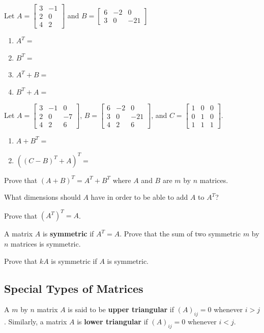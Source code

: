 \bq Let $A=\begin{bmatrix} 3&-1 \\2&0 \\ 4&2 \end{bmatrix}$ and $B=\begin{bmatrix} 6&-2&0 \\3&0&-21 \end{bmatrix}$
\begin{enumerate}
\item $A^T=$
\item $B^T=$
\item $A^T+B=$
\item $B^T+A=$
\end{enumerate}
\eq

\bq Let $A=\begin{bmatrix} 3&-1&0 \\2&0&-7 \\ 4&2&6 \end{bmatrix}$, $B=\begin{bmatrix} 6&-2&0 \\3&0&-21 \\ 4&2&6 \end{bmatrix}$, \break and $C=\begin{bmatrix} 1&0&0 \\0&1&0\\1&1&1 \end{bmatrix}$.
\begin{enumerate}
\item $A+B^T=$
\item $((C-B)^T+A)^T=$
\end{enumerate}
\eq

\bq Prove that $(A+B)^T=A^T+B^T$ where $A$ and $B$ are $m$ by $n$ matrices.
\eq

\bq What dimensions should $A$ have in order to be able to add $A$ to $A^T$?
\eq

\bq Prove that $(A^T)^T=A$.
\eq

A matrix $A$ is \textbf{symmetric} if $A^T=A$.
\bq Prove that the sum of two symmetric $m$ by $n$ matrices is symmetric.
\eq

\bq Prove that $kA$ is symmetric if $A$ is symmetric. \eq


\subsection{Special Types of Matrices}
A $m$ by $n$ matrix $A$ is said to be \textbf{upper triangular} if $(A)_{ij}=0$ whenever $i>j$. Similarly, a matrix $A$ is \textbf{lower triangular} if $(A)_{ij}=0$ whenever $i<j$.

